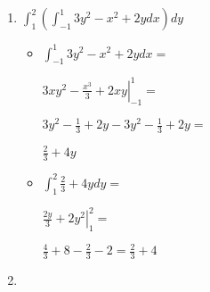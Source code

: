 \documentclass[../practica_08.tex]{subfiles}
\begin{document}
    \begin{enumerate}
        \item $\int_1^2(\int_{-1}^1 3y^2-x^2+2y dx)dy$
        
            \begin{itemize}
                \item $\int_{-1}^1 3y^2-x^2+2y dx=$
                
                    $\left. 3xy^2 - \frac{x^3}{3} + 2xy \right |_{-1}^1 = $

                    $ 3y^2 - \frac{1}{3} + 2y - 3y^2 - \frac{1}{3} + 2y = $

                    $ \frac{2}{3} + 4y $

                \item $ \int_1^2  \frac{2}{3} + 4y dy = $
                
                    $ \left. \frac{2y}{3} + 2y^2 \right |_1^2 = $

                    $ \frac{4}{3} + 8 - \frac{2}{3} - 2 = \frac{2}{3} + 4 $

            \end{itemize}

        \item $ $

    \end{enumerate}
\end{document}
